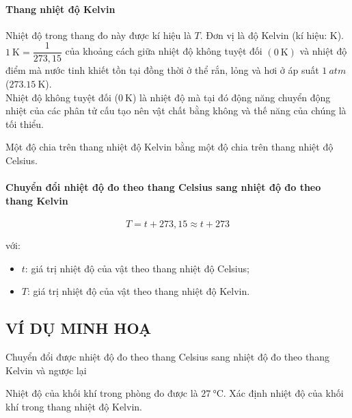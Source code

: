 \paragraph{Thang nhiệt độ Kelvin}
\begin{boxdn}
	Nhiệt độ trong thang đo này được kí hiệu là $T$. Đơn vị là độ Kelvin (kí hiệu: $\si{\kelvin}$).\\
	$\SI{1}{\kelvin}=\dfrac{1}{273,15}$ của khoảng cách giữa nhiệt độ không tuyệt đối $\left(\SI{0}{\kelvin}\right)$ và nhiệt độ điểm mà nước tinh khiết tồn tại đồng thời ở thể rắn, lỏng và hơi ở áp suất $\SI{1}{atm}$ ($\SI{273.15}{\kelvin}$).\\
	Nhiệt độ không tuyệt đối ($\SI{0}{\kelvin}$) là nhiệt độ mà tại đó động năng chuyển động nhiệt của các phân tử cấu tạo nên vật chất bằng không và thế năng của chúng là tối thiểu.
\end{boxdn}
\begin{luuy}
	Một độ chia trên thang nhiệt độ Kelvin bằng một độ chia trên thang nhiệt độ Celsius.
\end{luuy}
\paragraph{Chuyển đổi nhiệt độ đo theo thang Celsius sang nhiệt độ đo theo thang Kelvin}
\begin{boxdl}
	\begin{equation}
		T=t+273,15\approx t+273
	\end{equation}
\end{boxdl}
với:
\begin{itemize}
	\item $t$: giá trị nhiệt độ của vật theo thang nhiệt độ Celsius;
	\item $T$: giá trị nhiệt độ của vật theo thang nhiệt độ Kelvin.
\end{itemize}
\subsection{VÍ DỤ MINH HOẠ}
\begin{dang}{Chuyển đổi được nhiệt độ đo theo thang Celsius sang nhiệt độ đo theo thang Kelvin và ngược lại}

\end{dang}
	\begin{vd}
Nhiệt độ của khối khí trong phòng đo được là $\SI{27}{\celsius}$. Xác định nhiệt độ của khối khí trong thang nhiệt độ Kelvin.
		
	
\end{vd}

